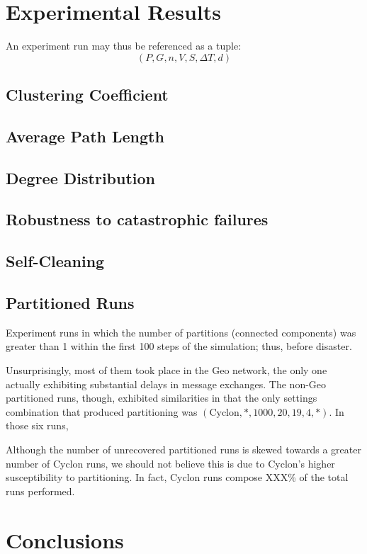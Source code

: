 \documentclass[a4paper]{ifacconf}
\newcommand{\DT}{\ensuremath{{\Delta}T}}
\begin{document}
\section{Experimental Results}

An experiment run may thus be referenced as a tuple:
$$
(P, G, n, V, S, \DT, d)
$$

\subsection{Clustering Coefficient}



\subsection{Average Path Length}

\subsection{Degree Distribution}

\subsection{Robustness to catastrophic failures}

\subsection{Self-Cleaning}

\subsection{Partitioned Runs}

Experiment runs in which the number of partitions (connected components) was greater than 1 within the first 100 steps of the simulation; thus, before disaster.

Unsurprisingly, most of them took place in the Geo network, the only one actually exhibiting substantial delays in message exchanges.
The non-Geo partitioned runs, though, exhibited similarities in that the only settings combination that produced partitioning was $(\text{Cyclon}, *, 1000, 20, 19, 4, *)$.
In those six runs, 

Although the number of unrecovered partitioned runs is skewed towards a greater number of Cyclon runs, we should not believe this is due to Cyclon's higher susceptibility to partitioning.
In fact, Cyclon runs compose XXX\% of the total runs performed.



\section{Conclusions}


\end{document}

